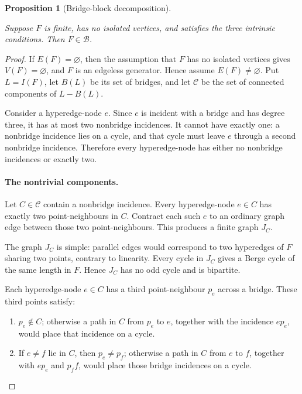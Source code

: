 \documentclass[a4paper,11pt,reqno]{amsart}
\providecommand{\tightlist}{\setlength{\itemsep}{0pt}\setlength{\parskip}{0pt}}
\theoremstyle{plain}
\newtheorem{proposition}[theorem]{Proposition}
\theoremstyle{definition}
\theoremstyle{remark}
\begin{document}
\begin{proposition}[Bridge-block decomposition]\label{proposition-5.2-bridge-block-decomposition}

Suppose \(F\) is finite, has no isolated vertices, and satisfies the three intrinsic conditions. Then \(F\in\mathcal B\).

\end{proposition}
\begin{proof}
If \(E(F)=\varnothing\), then the assumption that \(F\) has no isolated vertices gives \(V(F)=\varnothing\), and \(F\) is an edgeless generator. Hence assume \(E(F)\ne\varnothing\). Put \(L=I(F)\), let \(B(L)\) be its set of bridges, and let \(\mathscr C\) be the set of connected components of \(L-B(L)\).

Consider a hyperedge-node \(e\). Since \(e\) is incident with a bridge and has degree three, it has at most two nonbridge incidences. It cannot have exactly one: a nonbridge incidence lies on a cycle, and that cycle must leave \(e\) through a second nonbridge incidence. Therefore every hyperedge-node has either no nonbridge incidences or exactly two.

\paragraph{The nontrivial components.}\label{the-nontrivial-components}

Let \(C\in\mathscr C\) contain a nonbridge incidence. Every hyperedge-node \(e\in C\) has exactly two point-neighbours in \(C\). Contract each such \(e\) to an ordinary graph edge between those two point-neighbours. This produces a finite graph \(J_C\).

The graph \(J_C\) is simple: parallel edges would correspond to two hyperedges of \(F\) sharing two points, contrary to linearity. Every cycle in \(J_C\) gives a Berge cycle of the same length in \(F\). Hence \(J_C\) has no odd cycle and is bipartite.

Each hyperedge-node \(e\in C\) has a third point-neighbour \(p_e\) across a bridge. These third points satisfy:

\begin{enumerate}
\def\labelenumi{\arabic{enumi}.}
\tightlist
\item
  \(p_e\notin C\); otherwise a path in \(C\) from \(p_e\) to \(e\), together with the incidence \(ep_e\), would place that incidence on a cycle.
\item
  If \(e\ne f\) lie in \(C\), then \(p_e\ne p_f\); otherwise a path in \(C\) from \(e\) to \(f\), together with \(ep_e\) and \(p_ff\), would place those bridge incidences on a cycle.
\end{enumerate}


\end{proof}
\end{document}
